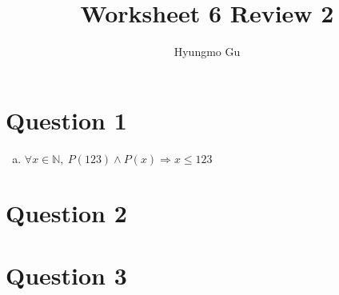 \documentclass[12pt]{article}
\begin{document}
\title{Worksheet 6 Review 2}
\author{Hyungmo Gu}
\maketitle

\section*{Question 1}
\begin{enumerate}[a.]
    \item $\forall x \in \mathbb{N},\:P(123) \land P(x) \Rightarrow x \leq 123$
\end{enumerate}

\section*{Question 2}

\section*{Question 3}
\end{document}
